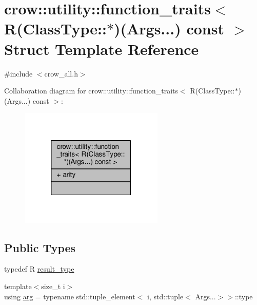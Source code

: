 \hypertarget{structcrow_1_1utility_1_1function__traits_3_01_r_07_class_type_1_1_5_08_07_args_8_8_8_08_01const_01_01_4}{\section{crow\-:\-:utility\-:\-:function\-\_\-traits$<$ R(Class\-Type\-:\-:$\ast$)(Args...) const $>$ Struct Template Reference}
\label{structcrow_1_1utility_1_1function__traits_3_01_r_07_class_type_1_1_5_08_07_args_8_8_8_08_01const_01_01_4}
}


{\ttfamily \#include $<$crow\-\_\-all.\-h$>$}



Collaboration diagram for crow\-:\-:utility\-:\-:function\-\_\-traits$<$ R(Class\-Type\-:\-:$\ast$)(Args...) const $>$\-:
\nopagebreak
\begin{figure}[H]
\begin{center}
\leavevmode
\includegraphics[width=194pt]{structcrow_1_1utility_1_1function__traits_3_01_r_07_class_type_1_1_5_08_07_args_8_8_8_08_01const_01_01_4__coll__graph}
\end{center}
\end{figure}
\subsection*{Public Types}
\begin{DoxyCompactItemize}
\item 
typedef R \hyperlink{structcrow_1_1utility_1_1function__traits_3_01_r_07_class_type_1_1_5_08_07_args_8_8_8_08_01const_01_01_4_ac9c4778b8d2febdb976eb7440a43b118}{result\-\_\-type}
\item 
{\footnotesize template$<$size\-\_\-t i$>$ }\\using \hyperlink{structcrow_1_1utility_1_1function__traits_3_01_r_07_class_type_1_1_5_08_07_args_8_8_8_08_01const_01_01_4_ae00f70f4d6fa347a7b4e010d2eb995c5}{arg} = typename std\-::tuple\-\_\-element$<$ i, std\-::tuple$<$ Args...$>$$>$\-::type
\end{DoxyCompactItemize}
